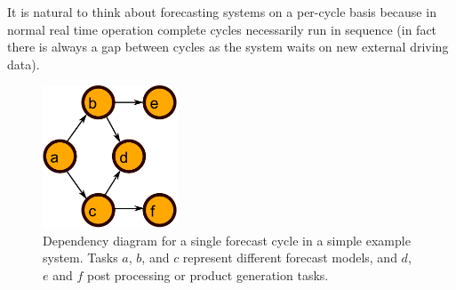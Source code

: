 \documentclass[11pt,a4paper]{article}
\begin{document}
It is natural to think about forecasting systems on a per-cycle basis
because in normal real time operation complete cycles necessarily run
in sequence (in fact there is always a gap between cycles as the system
waits on new external driving data). 
\begin{figure}
    \begin{center}
        \includegraphics[width=4cm]{dependencies-one}
    \end{center}
    \caption{\small Dependency diagram for a single forecast cycle
    in a simple example system. Tasks $a$, $b$, and $c$ represent
    different forecast models, and $d$, $e$ and $f$ post processing or
    product generation tasks.}
    \label{fig-dep-one}
\end{figure}
\end{document}
